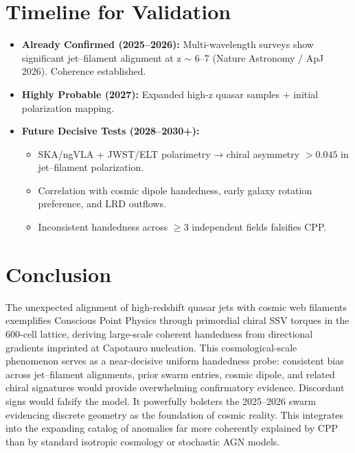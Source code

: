 \documentclass[11pt]{article}
\begin{document}
\section{Timeline for Validation}
\begin{itemize}
    \item \textbf{Already Confirmed (2025--2026):} Multi-wavelength surveys show significant jet–filament alignment at z $\sim$ 6--7 (Nature Astronomy / ApJ 2026). Coherence established.
    \item \textbf{Highly Probable (2027):} Expanded high-z quasar samples + initial polarization mapping.
    \item \textbf{Future Decisive Tests (2028--2030+):}
    \begin{itemize}
        \item SKA/ngVLA + JWST/ELT polarimetry → chiral asymmetry $>0.045$ in jet–filament polarization.
        \item Correlation with cosmic dipole handedness, early galaxy rotation preference, and LRD outflows.
        \item Inconsistent handedness across $\geq 3$ independent fields falsifies CPP.
    \end{itemize}
\end{itemize}

\section{Conclusion}
The unexpected alignment of high-redshift quasar jets with cosmic web filaments exemplifies Conscious Point Physics through primordial chiral SSV torques in the 600-cell lattice, deriving large-scale coherent handedness from directional gradients imprinted at Capotauro nucleation.  
This cosmological-scale phenomenon serves as a near-decisive uniform handedness probe: consistent bias across jet–filament alignments, prior swarm entries, cosmic dipole, and related chiral signatures would provide overwhelming confirmatory evidence. Discordant signs would falsify the model. It powerfully bolsters the 2025--2026 swarm evidencing discrete geometry as the foundation of cosmic reality.  
This integrates into the expanding catalog of anomalies far more coherently explained by CPP than by standard isotropic cosmology or stochastic AGN models.
\end{document}
